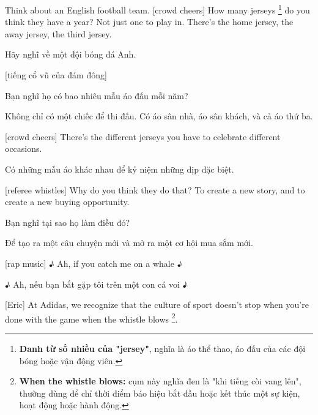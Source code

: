 \documentclass[a4paper]{article}
\begin{document}
	Think about an English football team.
	[crowd cheers]
	How many jerseys \footnote{
		\textbf{Danh từ số nhiều của "jersey"}, nghĩa là áo thể thao, áo đấu của các đội bóng hoặc vận động viên.
	
	} do you think they have a year?
	Not just one to play in. There's the home jersey, the away jersey, the third jersey.
	
	\begin{vietnamese-v2}
		Hãy nghĩ về một đội bóng đá Anh.
		
		[tiếng cổ vũ của đám đông]
		
		Bạn nghĩ họ có bao nhiêu mẫu áo đấu mỗi năm?
		
		Không chỉ có một chiếc để thi đấu. Có áo sân nhà, áo sân khách, và cả áo thứ ba.
	\end{vietnamese-v2}
	
	[crowd cheers]
	There's the different jerseys you have to celebrate different occasions.
	
	\begin{vietnamese-v2}
		
		Có những mẫu áo khác nhau để kỷ niệm những dịp đặc biệt.
	\end{vietnamese-v2}
	
	[referee whistles]
	Why do you think they do that?
	To create a new story, and to create a new buying opportunity.
	
	\begin{vietnamese-v2}
		
		Bạn nghĩ tại sao họ làm điều đó?
		
		Để tạo ra một câu chuyện mới và mở ra một cơ hội mua sắm mới.
	\end{vietnamese-v2}
	
	[rap music]
	♪ Ah, if you catch me on a whale ♪
	
	\begin{vietnamese-v2}
		
		♪ Ah, nếu bạn bắt gặp tôi trên một con cá voi ♪
	\end{vietnamese-v2}
	
	
	[Eric] At Adidas, we recognize that the culture of sport doesn't stop when you're done with the game when the whistle blows \footnote{
		\textbf{When the whistle blows:} cụm này nghĩa đen là "khi tiếng còi vang lên", thường dùng để chỉ thời điểm báo hiệu bắt đầu hoặc kết thúc một sự kiện, hoạt động hoặc hành động.
	
	}.
	
\end{document}

